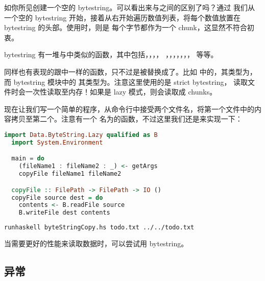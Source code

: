 \documentclass[./main.tex]{subfiles}
\begin{document}
如你所见创建一个空的 bytestring。可以看出来与之间的区别了吗？通过
我们从一个空的 bytestring 开始，接着从右开始遍历数值列表，将每个数值放置在 bytestring 的头部。使用时，则是
每个字节都作为一个 chunk，这显然不符合初衷。

bytestring 有一堆与中类似的函数，其中包括，，，，
，，，，，，，
等等。

同样也有表现的跟中一样的函数，只不过是被替换成了。比如
中的，其类型为，而 bytestring 模块中的
其类型为。注意这里使用的是 strict bytestring，
读取文件时会一次性读取至内存！如果是 lazy 模式，则会读取成 chunks。

现在让我们写一个简单的程序，从命令行中接受两个文件名，将第一个文件中的内容拷贝至第二个。注意有一个
名为的函数，不过这里我们还是来实现一下：

\begin{lstlisting}[language=Haskell]
  import Data.ByteString.Lazy qualified as B
  import System.Environment

  main = do
    (fileName1 : fileName2 : _) <- getArgs
    copyFile fileName1 fileName2

  copyFile :: FilePath -> FilePath -> IO ()
  copyFile source dest = do
    contents <- B.readFile source
    B.writeFile dest contents
\end{lstlisting}

\begin{lstlisting}[language=Bash]
  runhaskell byteStringCopy.hs todo.txt ../../todo.txt
\end{lstlisting}

当需要更好的性能来读取数据时，可以尝试用 bytestring。

\subsection*{异常}

\end{document}
